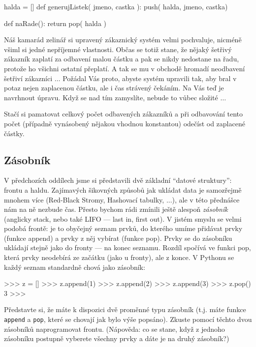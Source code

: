 \begin{python}
halda = []
def generujListek( jmeno, castka ):
  push( halda, jmeno, castka)

def naRade():
  return pop( halda )
\end{python}

\begin{cviceni} Náš kamarád zelinář si upravený zákaznický systém velmi pochvaluje, nicméně všiml si jedné nepříjemné vlastnosti.
Občas se totiž stane, že nějaký šetřivý zákazník zaplatí za odbavení malou částku a pak se nikdy nedostane na řadu, protože ho
všichni ostatní přeplatí. A tak se mu v obchodě hromadí neodbavení šetřiví zákazníci $\ldots$ Požádal Vás proto, abyste systém
upravili tak, aby bral v potaz nejen zaplacenou částku, ale i čas strávený čekáním. Na Vás teď je navrhnout úpravu. Když se nad
tím zamyslíte, nebude to vůbec složité $\ldots$
\end{cviceni}

\begin{reseni}
Stačí si pamatovat celkový počet odbavených zákazníků a při odbavování tento počet (případně vynásobený nějakou vhodnou konstantou)
odečíst od zaplacené částky.
\end{reseni}

\subsection*{Zásobník}

V předchozích oddílech jsme si představili dvě základní ``datové struktury'':
frontu a haldu. Zajímavých šikovných způsobů jak ukládat data je samozřejmě
mnohem více  (Red-Black Stromy, Hashovací tabulky, ...), ale v této přednášce
nám na ně nezbude čas. Přesto bychom rádi zmínili ještě alespoň \emph{zásobník}
(anglicky stack, nebo také LIFO --- last in, first out). V jistém smyslu se
velmi podobá frontě: je to obyčejný seznam prvků, do kterého umíme přidávat
prvky (funkce append) a prvky z něj vybírat (funkce pop). Prvky se do zásobníku
ukládají stejně jako do fronty --- na konec seznamu. Rozdíl spočívá ve funkci
pop, která prvky neodebírá ze začátku (jako u fronty), ale z konce. V Pythonu
se každý seznam standardně chová jako zásobník:

\begin{python}
>>> z = []
>>> z.append(1)
>>> z.append(2)
>>> z.append(3)
>>> z.pop()
3
>>>
\end{python}

\begin{cviceni} Představte si, že máte k dispozici dvě proměnné typu zásobník
(t.j. máte funkce {\tt append} a {\tt pop}, které se chovají jak bylo výše popsáno).
Zkuste pomocí těchto dvou zásobníků naprogramovat frontu. (Nápověda: co se stane,
když z jednoho zásobníku postupně vyberete všechny prvky a dáte je na druhý zásobník?)
\end{cviceni}

\begin{reseni}
\end{reseni}


\ifx\ucebnice\undefined

\fi
